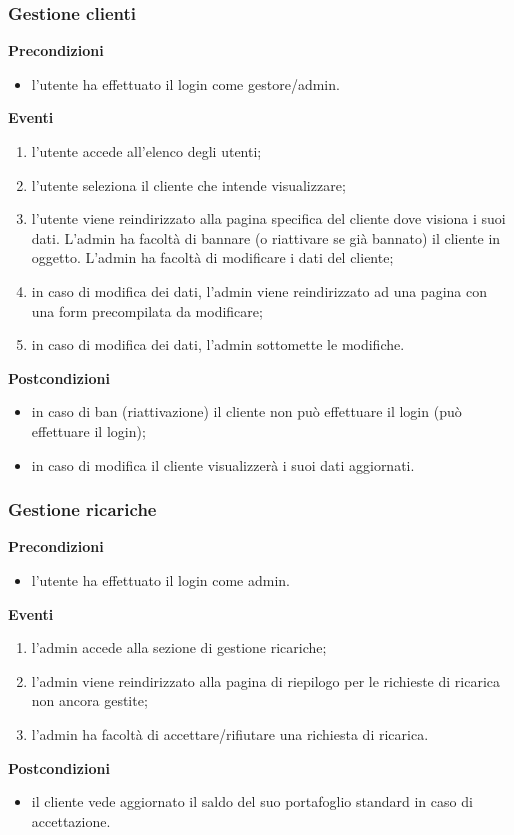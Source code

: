 \documentclass[a4paper, 14pt]{article}
\begin{document}
\begin{flushleft}
			\subsubsection{Gestione clienti}
			\textbf{Precondizioni}
			\begin{itemize}
				\item l'utente ha effettuato il login come gestore/admin.
			\end{itemize}
			\textbf{Eventi}
			\begin{enumerate}
				\item l'utente accede all'elenco degli utenti;
				\item l'utente seleziona il cliente che intende visualizzare;
				\item l'utente viene reindirizzato alla pagina specifica del cliente dove visiona i suoi dati.
					  L'admin ha facoltà di bannare (o riattivare se già bannato) il cliente in oggetto.
					  L'admin ha facoltà di modificare i dati del cliente;
				\item in caso di modifica dei dati, l'admin viene reindirizzato ad una pagina con una form precompilata
					  da modificare;
				\item in caso di modifica dei dati, l'admin sottomette le modifiche.
			\end{enumerate}
			\textbf{Postcondizioni}
			\begin{itemize}
				\item in caso di ban (riattivazione) il cliente non può effettuare il login (può effettuare il login);
				\item in caso di modifica il cliente visualizzerà i suoi dati aggiornati.
			\end{itemize}
			
			\bigskip
			
			\subsubsection{Gestione ricariche}
			\textbf{Precondizioni}
			\begin{itemize}
				\item l'utente ha effettuato il login come admin.
			\end{itemize}
			\textbf{Eventi}
			\begin{enumerate}
				\item l'admin accede alla sezione di gestione ricariche;
				\item l'admin viene reindirizzato alla pagina di riepilogo per le richieste di ricarica non ancora gestite;
				\item l'admin ha facoltà di accettare/rifiutare una richiesta di ricarica.
			\end{enumerate}
			\textbf{Postcondizioni}
			\begin{itemize}
				\item il cliente vede aggiornato il saldo del suo portafoglio standard in caso di accettazione.
			\end{itemize}
			

\end{flushleft}
\end{document}
